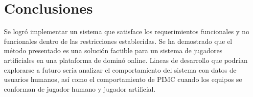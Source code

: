 \chapter*{Conclusiones}


\noindent
Se logró implementar un sistema que satisface los requerimientos funcionales y
no funcionales dentro de las restricciones establecidas. Se ha demostrado que el
método presentado es una solución factible para un sistema de jugadores
artificiales en una plataforma de dominó online. Lineas de desarrollo que
podrían explorarse a futuro sería analizar el comportamiento del sistema con
datos de usuarios humanos, así como el comportamiento de  PIMC cuando los
equipos se conforman de jugador humano y jugador artificial.